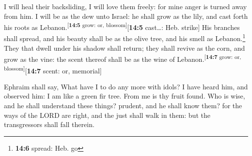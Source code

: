  I will heal their backsliding, I will love them freely:
for mine anger is turned away from him.  I will be as the
dew unto Israel: he shall grow as the lily, and cast forth his roots as
Lebanon.\textsuperscript{{[}\textbf{14:5} grow: or,
blossom{]}}{[}\textbf{14:5} cast\ldots: Heb. strike{]} 
His branches shall spread, and his beauty shall be as the olive tree,
and his smell as Lebanon.\footnote{\textbf{14:6} spread: Heb. go}
 They that dwell under his shadow shall return; they shall
revive as the corn, and grow as the vine: the scent thereof shall be as
the wine of Lebanon.\textsuperscript{{[}\textbf{14:7} grow: or,
blossom{]}}{[}\textbf{14:7} scent: or, memorial{]}

 Ephraim shall say, What have I to do any more with idols?
I have heard him, and observed him: I am like a green fir tree. From me
is thy fruit found.  Who is wise, and he shall understand
these things? prudent, and he shall know them? for the ways of the LORD
are right, and the just shall walk in them: but the transgressors shall
fall therein.
